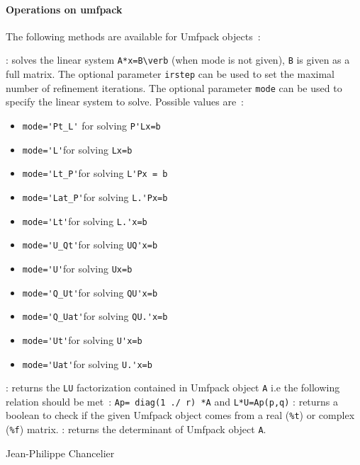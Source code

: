 \paragraph{Operations on umfpack}
The following methods are available for Umfpack objects~:
\begin{varlist}
  : solves the linear system \verb+A*x=B\verb+ (when mode is not given), \verb+B+ is given as a full 
   matrix. The optional parameter \verb+irstep+ can be used to set the maximal number of refinement iterations.
   The optional parameter \verb+mode+ can be used to specify the linear system to solve. Possible values are~:
     \begin{itemize} 
        \item \verb+mode='Pt_L'+ for solving \verb+P'Lx=b+
        \item \verb+mode='L'+for solving \verb+Lx=b+
        \item \verb+mode='Lt_P'+for solving \verb+L'Px = b+
        \item \verb+mode='Lat_P'+for solving \verb+L.'Px=b+
        \item \verb+mode='Lt'+for solving \verb+L.'x=b+
        \item \verb+mode='U_Qt'+for solving \verb+UQ'x=b+
        \item \verb+mode='U'+for solving \verb+Ux=b+
        \item \verb+mode='Q_Ut'+for solving \verb+QU'x=b+
        \item \verb+mode='Q_Uat'+for solving \verb+QU.'x=b+
        \item \verb+mode='Ut'+for solving \verb+U'x=b+
        \item \verb+mode='Uat'+for solving \verb+U.'x=b+
     \end{itemize}
  : returns the \verb+LU+ factorization contained in Umfpack object \verb+A+ i.e the following relation should be met~: \verb+Ap= diag(1 ./ r) *A+ and 
  \verb+L*U=Ap(p,q)+ 
  : returns a boolean to check if the given Umfpack object comes from a real 
(\verb+%t+) or complex (\verb+%f+) matrix. 
: returns the determinant of Umfpack object \verb+A+.
  \end{varlist}

\begin{examples}
  \begin{program} 
  \end{program}
 \end{examples}

\begin{authors}
  Jean-Philippe Chancelier
\end{authors}
